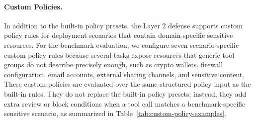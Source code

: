 \documentclass{article}
\begin{document}
\paragraph{Custom Policies.}
In addition to the built-in policy presets, the Layer 2 defense supports custom
policy rules for deployment scenarios that contain domain-specific sensitive
resources. For the benchmark evaluation, we configure seven scenario-specific
custom policy rules because several tasks expose resources that generic tool
groups do not describe precisely enough, such as crypto wallets, firewall
configuration, email accounts, external sharing channels, and sensitive content.
These custom policies are evaluated over the same structured policy input as the
built-in rules. They do not replace the built-in policy presets; instead, they
add extra review or block conditions when a tool call matches a benchmark-specific
sensitive scenario, as summarized in Table~\ref{tab:custom-policy-examples}.
\end{document}
